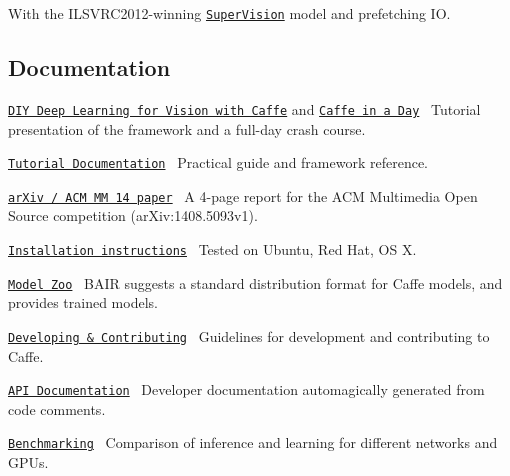 \begin{DoxyItemize}
\item With the I\+L\+S\+V\+R\+C2012-\/winning \href{http://www.image-net.org/challenges/LSVRC/2012/supervision.pdf}{\tt Super\+Vision} model and prefetching IO. 
\end{DoxyItemize}

\subsection*{Documentation}


\begin{DoxyItemize}
\item \href{https://docs.google.com/presentation/d/1UeKXVgRvvxg9OUdh_UiC5G71UMscNPlvArsWER41PsU/edit#slide=id.p}{\tt D\+IY Deep Learning for Vision with Caffe} and \href{https://docs.google.com/presentation/d/1HxGdeq8MPktHaPb-rlmYYQ723iWzq9ur6Gjo71YiG0Y/edit#slide=id.gc2fcdcce7_216_0}{\tt Caffe in a Day}~\newline
 Tutorial presentation of the framework and a full-\/day crash course.
\item \href{/tutorial}{\tt Tutorial Documentation}~\newline
 Practical guide and framework reference.
\item \href{http://arxiv.org/abs/1408.5093}{\tt ar\+Xiv / A\+CM MM \textquotesingle{}14 paper}~\newline
 A 4-\/page report for the A\+CM Multimedia Open Source competition (ar\+Xiv\+:1408.\+5093v1).
\item \href{/installation.html}{\tt Installation instructions}~\newline
 Tested on Ubuntu, Red Hat, OS X.
\item \href{/model_zoo.html}{\tt Model Zoo}~\newline
 B\+A\+IR suggests a standard distribution format for Caffe models, and provides trained models.
\item \href{/development.html}{\tt Developing \& Contributing}~\newline
 Guidelines for development and contributing to Caffe.
\item \href{/doxygen/annotated.html}{\tt A\+PI Documentation}~\newline
 Developer documentation automagically generated from code comments.
\item \href{https://docs.google.com/spreadsheets/d/1Yp4rqHpT7mKxOPbpzYeUfEFLnELDAgxSSBQKp5uKDGQ/edit#gid=0}{\tt Benchmarking}~\newline
 Comparison of inference and learning for different networks and G\+P\+Us.
\end{DoxyItemize}

